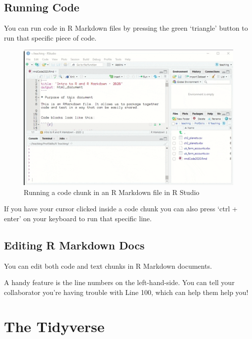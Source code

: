 \documentclass[
]{book}
\begin{document}
\hypertarget{codermd}{%
\section{Running Code}\label{codermd}}

You can run code in R Markdown files by pressing the green `triangle' button to run that specific piece of code.

\begin{figure}

{\centering \includegraphics{images/06_workflows/runcode} 

}

\caption{Running a code chunk in an R Markdown file in R Studio}\label{fig:unnamed-chunk-107}
\end{figure}

If you have your cursor clicked inside a code chunk you can also press `ctrl + enter' on your keyboard to run that specific line.

\hypertarget{editrmd}{%
\section{Editing R Markdown Docs}\label{editrmd}}

You can edit both code and text chunks in R Markdown documents.

A handy feature is the line numbers on the left-hand-side. You can tell your collaborator you're having trouble with Line 100, which can help them help you!

\hypertarget{tidyverse}{%
\chapter{The Tidyverse}\label{tidyverse}}
\end{document}
